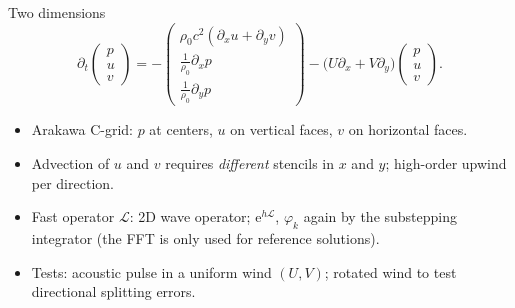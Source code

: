 \documentclass[aspectratio=169,10pt]{beamer}
\newcommand{\ee}{\mathrm{e}}
\newcommand{\LL}{\mathcal{L}}   %
\newcommand{\ph}{\varphi}
\begin{document}
\begin{frame}{Two dimensions}
  \[
    \partial_t\!\begin{pmatrix}p\\u\\v\end{pmatrix}
    =-\begin{pmatrix}\rho_0c^2(\partial_xu+\partial_yv)\\ \tfrac1{\rho_0}\partial_xp\\ \tfrac1{\rho_0}\partial_yp\end{pmatrix}
     -\big(U\partial_x+V\partial_y\big)\begin{pmatrix}p\\u\\v\end{pmatrix}.
  \]
  \begin{center}
  \end{center}
  \begin{itemize}
    \item Arakawa C-grid: $p$ at centers, $u$ on vertical faces, $v$ on horizontal faces.
    \item Advection of $u$ and $v$ requires \emph{different} stencils in $x$ and $y$; high-order upwind per direction.
    \item Fast operator $\LL$: 2D wave operator; $\ee^{h\LL}$, $\ph_k$ again by the substepping integrator (the FFT is only used for reference solutions).
    \item Tests: acoustic pulse in a uniform wind $(U,V)$; rotated wind to test directional splitting errors.
  \end{itemize}
\end{frame}
\end{document}
